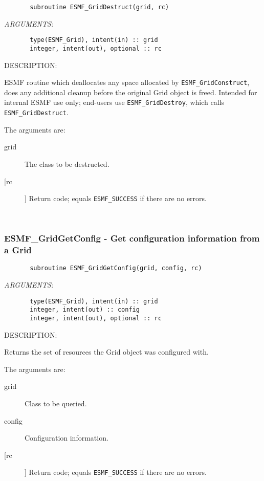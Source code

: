 {
\begin{verbatim}       subroutine ESMF_GridDestruct(grid, rc)\end{verbatim}{\em ARGUMENTS:}
\begin{verbatim}       type(ESMF_Grid), intent(in) :: grid    
       integer, intent(out), optional :: rc         \end{verbatim}
{\sf DESCRIPTION:\\ }


       ESMF routine which deallocates any space allocated by
      {\tt  ESMF\_GridConstruct}, does any additional cleanup before the
       original Grid object is freed.  Intended for internal ESMF
       use only; end-users use {\tt ESMF\_GridDestroy}, which calls
       {\tt ESMF\_GridDestruct}.  
  
       The arguments are:
       \begin{description}
       \item[grid] 
            The class to be destructed.
       \item[[rc]] 
            Return code; equals {\tt ESMF\_SUCCESS} if there are no errors.
       \end{description}
   
 
\mbox{}\hrulefill\ 
 
\subsubsection{ESMF\_GridGetConfig - Get configuration information from a Grid}


 
\begin{verbatim}       subroutine ESMF_GridGetConfig(grid, config, rc)\end{verbatim}{\em ARGUMENTS:}
\begin{verbatim}       type(ESMF_Grid), intent(in) :: grid
       integer, intent(out) :: config   
       integer, intent(out), optional :: rc              \end{verbatim}
{\sf DESCRIPTION:\\ }


       Returns the set of resources the Grid object was configured with.
  
       The arguments are:
       \begin{description}
       \item[grid] 
            Class to be queried.
       \item[config]
            Configuration information.         
       \item[[rc]] 
            Return code; equals {\tt ESMF\_SUCCESS} if there are no errors.
       \end{description}
   
}
